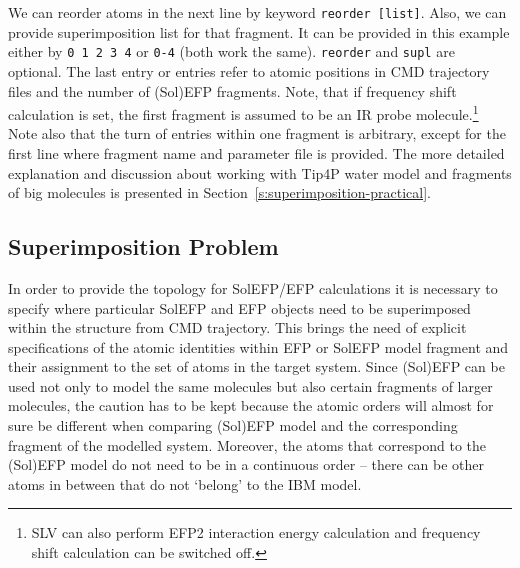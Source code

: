 \documentclass[b5paper,oneside,fleqn,11pt]{book}
\begin{document}
\begin{refsection}
We can reorder atoms in the next line
by keyword {\tt reorder [list]}. Also, we can provide 
superimposition list for that fragment. It can be
provided in this example either by {\tt 0 1 2 3 4} 
or {\tt 0-4} (both work the same). {\tt reorder} and {\tt supl} are
optional. The last entry or entries refer to atomic positions in CMD trajectory 
files and the number of
(Sol)EFP fragments. Note, that if frequency shift calculation is set, the first fragment
is assumed to be an IR probe molecule.\footnote{SLV can also perform
EFP2 interaction energy calculation and frequency shift calculation
can be switched off.} 
Note also that the turn of entries within one fragment is
arbitrary, except for the first line where fragment name and parameter file is provided. The more
detailed explanation and discussion about working with Tip4P water model and fragments of big
molecules is presented in Section~\ref{s:superimposition-practical}.



\subsection{Superimposition Problem\label{s:superimposition-practical}}

In order to provide the topology for SolEFP/EFP calculations it is necessary to specify where particular
SolEFP and EFP objects need to be superimposed within the structure from CMD trajectory. This brings
the need of explicit specifications of the atomic identities within EFP or SolEFP model fragment and their
assignment to the set of atoms in the target system. Since (Sol)EFP can be used not only to model
the same molecules but also certain fragments of larger molecules, the caution has to be kept because
the atomic orders will almost for sure be different when comparing (Sol)EFP model and the
corresponding fragment of the modelled system. Moreover, the atoms that correspond to the
(Sol)EFP model do not need to be in a continuous order -- there can be other atoms in between that
do not `belong' to the IBM model.


\end{refsection}
\end{document}
